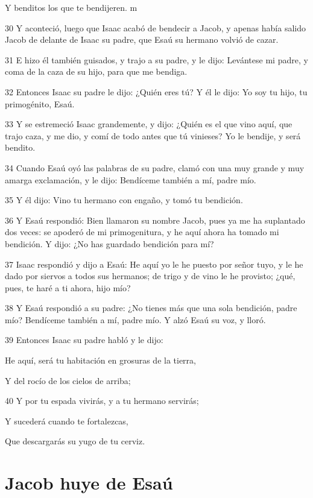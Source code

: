 \par Y benditos los que te bendijeren. m
\par 30 Y aconteció, luego que Isaac acabó de bendecir a Jacob, y apenas había salido Jacob de delante de Isaac su padre, que Esaú su hermano volvió de cazar.
\par 31 E hizo él también guisados, y trajo a su padre, y le dijo: Levántese mi padre, y coma de la caza de su hijo, para que me bendiga.
\par 32 Entonces Isaac su padre le dijo: ¿Quién eres tú? Y él le dijo: Yo soy tu hijo, tu primogénito, Esaú.
\par 33 Y se estremeció Isaac grandemente, y dijo: ¿Quién es el que vino aquí, que trajo caza, y me dio, y comí de todo antes que tú vinieses? Yo le bendije, y será bendito.
\par 34 Cuando Esaú oyó las palabras de su padre, clamó con una muy grande y muy amarga exclamación, y le dijo: Bendíceme también a mí, padre mío.
\par 35 Y él dijo: Vino tu hermano con engaño, y tomó tu bendición.
\par 36 Y Esaú respondió: Bien llamaron su nombre Jacob, pues ya me ha suplantado dos veces: se apoderó de mi primogenitura, y he aquí ahora ha tomado mi bendición. Y dijo: ¿No has guardado bendición para mí?
\par 37 Isaac respondió y dijo a Esaú: He aquí yo le he puesto por señor tuyo, y le he dado por siervos a todos sus hermanos; de trigo y de vino le he provisto; ¿qué, pues, te haré a ti ahora, hijo mío?
\par 38 Y Esaú respondió a su padre: ¿No tienes más que una sola bendición, padre mío? Bendíceme también a mí, padre mío. Y alzó Esaú su voz, y lloró.
\par 39 Entonces Isaac su padre habló y le dijo:
\par He aquí, será tu habitación en grosuras de la tierra,
\par Y del rocío de los cielos de arriba;
\par 40 Y por tu espada vivirás, y a tu hermano servirás;
\par Y sucederá cuando te fortalezcas,
\par Que descargarás su yugo de tu cerviz.

\section*{Jacob huye de Esaú}

